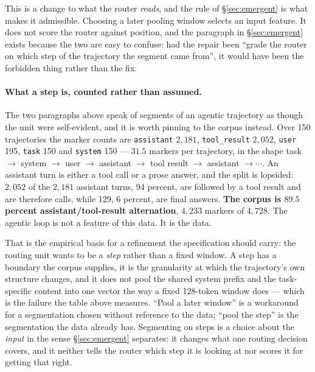 \documentclass[11pt]{article}
\begin{document}
This is a change to what the router \emph{reads}, and the rule of \S\ref{sec:emergent} is what makes it admissible. Choosing a later pooling window selects an input feature. It does not score the router against position, and the paragraph in \S\ref{sec:emergent} exists because the two are easy to confuse: had the repair been ``grade the router on which step of the trajectory the segment came from'', it would have been the forbidden thing rather than the fix.

\paragraph{What a step is, counted rather than assumed.} The two paragraphs above speak of segments of an agentic trajectory as though the unit were self-evident, and it is worth pinning to the corpus instead. Over 150 trajectories the marker counts are \texttt{assistant} $2{,}181$, \texttt{tool\_result} $2{,}052$, \texttt{user} 195, \texttt{task} 150 and \texttt{system} 150 --- $31.5$ markers per trajectory, in the shape task $\rightarrow$ system $\rightarrow$ user $\rightarrow$ assistant $\rightarrow$ tool result $\rightarrow$ assistant $\rightarrow \cdots$. An assistant turn is either a tool call or a prose answer, and the split is lopsided: $2{,}052$ of the $2{,}181$ assistant turns, 94 percent, are followed by a tool result and are therefore calls, while 129, 6 percent, are final answers. \textbf{The corpus is $89.5$ percent assistant/tool-result alternation}, $4{,}233$ markers of $4{,}728$. The agentic loop is not a feature of this data. It is the data.

That is the empirical basis for a refinement the specification should carry: the routing unit wants to be a \emph{step} rather than a fixed window. A step has a boundary the corpus supplies, it is the granularity at which the trajectory's own structure changes, and it does not pool the shared system prefix and the task-specific content into one vector the way a fixed 128-token window does --- which is the failure the table above measures. ``Pool a later window'' is a workaround for a segmentation chosen without reference to the data; ``pool the step'' is the segmentation the data already has. Segmenting on steps is a choice about the \emph{input} in the sense \S\ref{sec:emergent} separates: it changes what one routing decision covers, and it neither tells the router which step it is looking at nor scores it for getting that right.
\end{document}

